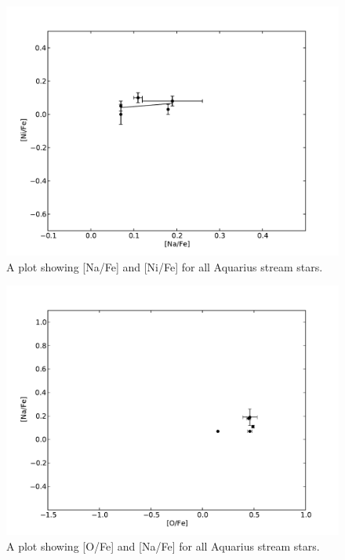 \documentclass{emulateapj}
\begin{document}
\begin{figure}[h]
	\includegraphics[width=\columnwidth]{./figures/aquarius-na-ni.pdf}
	\caption{A plot showing [Na/Fe] and [Ni/Fe] for all Aquarius stream stars.}
	\label{fig:na-ni}
\end{figure}

\begin{figure}[h]
	\includegraphics[width=\columnwidth]{./figures/aquarius-o-na.pdf}
	\caption{A plot showing [O/Fe] and [Na/Fe] for all Aquarius stream stars.}
	\label{fig:o-na}
\end{figure}
\end{document}
